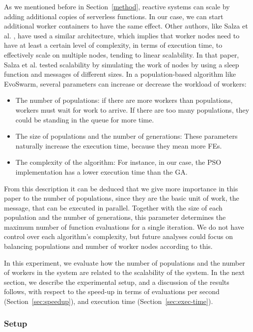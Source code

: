\documentclass[review]{elsarticle}
\begin{document}
As we mentioned before in Section~\ref{method}, reactive systems can scale by adding additional copies
of serverless functions. In our case, we can start additional worker containers
to have the same effect. Other authors, like Salza et al. \cite{salza2019speed},
have used a similar architecture, which implies that worker nodes need to have at least a certain level
of complexity, in terms of execution time,  to effectively scale on multiple
nodes, tending to linear scalability. In that paper, Salza et al. tested scalability
by simulating the work of nodes by using a sleep function and messages of different sizes.
In a population-based algorithm like EvoSwarm, several parameters can increase or 
decrease the workload of workers:

\begin{itemize}
    \item The number of populations: if there are more workers than populations, workers
    must wait for work to arrive. If there are too many populations, they could be
    standing in the queue for more time.
    \item The size of populations and the number of generations:
    These parameters naturally increase the execution time, because they mean more FEs.
    \item The complexity of the algorithm: For instance, in our case,
    the PSO implementation has a lower execution time than the GA.
\end{itemize}




From this description it can be deduced that we give more importance in this
paper to the number of populations, since they are the basic unit of
work, the message, that
can be executed in parallel. Together with the size of each population and the
number of generations, this parameter determines the maximum number of function
evaluations for a single iteration. We do not have control over each algorithm's
complexity, but future analyses could focus on balancing populations and number
of worker nodes according to this.

In this experiment, we evaluate how the number of populations and the number of
workers in the system are related to the scalability of the system.
In the next section, we describe the experimental setup, and a discussion of the results
follows, with respect to the speed-up in terms of evaluations per second (Section~\ref{sec:speedup}), and 
execution time (Section~\ref{sec:exec-time}).

\subsubsection{Setup} %
\end{document}
